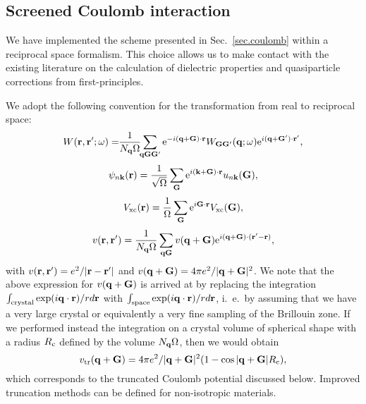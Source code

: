 \documentclass[twocolumn,prb,showpacs,superscriptaddress]{revtex4}
\def\w{\omega}
\def\q{{\bf q}}
\def\k{{\bf k}}
\def\G{{\bf G}}
\def\Gp{{\bf G^\prime}}
\def\r{{\bf r}}
\def\rp{{\bf r^\prime}}
\begin{document}
\subsection{Screened Coulomb interaction}\label{sec.coulomb.g}

We have implemented the scheme presented in Sec.\ \ref{sec.coulomb}
within a reciprocal space formalism. This choice allows us to make
contact with the existing literature on the 
calculation of dielectric properties and quasiparticle 
corrections from first-principles.\cite{hl86,balde_tosa,baroni-resta,hl86-prb,reining,cpm}

We adopt the following convention for the transformation from real
to reciprocal space:
  \begin{equation}
  W(\r,\rp;\w) = \!\!\frac{1}{N_\q\Omega} \!\! \sum_{\q\G\Gp} 
  {\rm e}^{-i(\q+\G)\cdot\r}
  W_{\G\Gp}(\q;\w)
  {\rm e}^{i(\q+\Gp)\cdot\rp},
  \end{equation}
  \begin{equation}
  \psi_{n\k}(\r)=\frac{1}{\sqrt{\Omega}}\sum_\G
  {\rm e}^{i(\k+\G)\cdot\r} u_{n\k}(\G),
  \end{equation}
  \begin{equation}
  V_{\rm xc}(\r)=\frac{1}{\Omega}\sum_\G
  {\rm e}^{i\G\cdot\r} V_{\rm xc}(\G),
  \end{equation}
  \begin{equation}
  v(\r,\rp) = \frac{1}{N_\q\Omega}  \sum_{\q\G} v(\q+\G)
  {\rm e}^{i(\q+\G)\cdot(\rp-\r)},
  \end{equation}
with $v(\r,\rp) = e^2/|\r-\rp|$ and $v(\q+\G) = 4\pi e^2/|\q+\G|^2$.
We note that the above expression for $v(\q+\G)$ is arrived at by replacing
the integration $\int_{\rm crystal} \exp(i\q\cdot\r)/r d\r$ with
$\int_{\rm space} \exp(i\q\cdot\r)/r d\r$, i.\ e.\ by assuming that we
have a very large crystal or equivalently a very fine sampling of the Brillouin zone.
If we performed instead the integration on a crystal volume of spherical
shape with a radius $R_{\rm c}$ defined by the volume $N_\q \Omega$, then we would obtain
  \begin{equation}
  v_{\rm tr} (\q+\G) = 4\pi e^2/|\q+\G|^2 (1-\cos |\q+\G| R_{\rm c}),
  \end{equation}
which corresponds to the truncated Coulomb potential discussed below.
Improved truncation methods can be defined for non-isotropic materials.\cite{sohrab}
\end{document}
